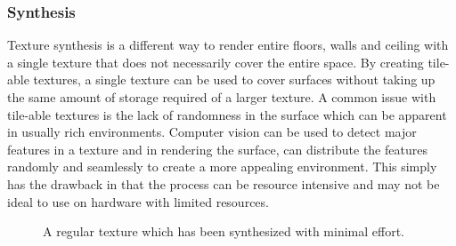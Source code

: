 \documentclass[12pt]{CPP}
\begin{document}
\subsubsection{Synthesis}
Texture synthesis is a different way to render entire floors, walls and ceiling with a single texture that does not necessarily cover the entire space. By creating tile-able textures, a single texture can be used to cover surfaces without taking up the same amount of storage required of a larger texture. A common issue with tile-able textures is the lack of randomness in the surface which can be apparent in usually rich environments. Computer vision can be used to detect major features in a texture and in rendering the surface, can distribute the features randomly and seamlessly to create a more appealing environment. This simply has the drawback in that the process can be resource intensive and may not be ideal to use on hardware with limited resources. \citep{Efros}
\begin{figure}[!htbp]
   \begin{center}
   \caption{A regular texture which has been synthesized with minimal effort.}
   \end{center}
\end{figure}
\end{document}
